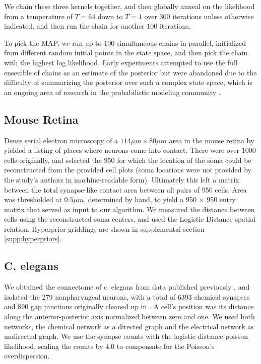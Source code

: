 \documentclass{article}
\begin{document}
We chain these three kernels together, and then globally
anneal on the likelihood from a temperature of $T=64$ down to 
$T=1$ over 300 iterations unless otherwise indicated, and
then run the chain for another $100$ iterations. 

To pick the MAP, we run up to $100$ simultaneous chains in parallel,
initialized from different random initial points in the state space,
and then pick the chain with the highest log likelihood. Early
experiments attempted to use the full ensemble of chains as an
estimate of the posterior but were abandoned due to the difficulty of
summarizing the posterior over such a complex state space, which is an
ongoing area of research in the probabilistic modeling community
.




\subsection {Mouse Retina}
\label{supp:mouseretina}
Dense serial electron microscopy of a $114\mu m \times 80 \mu m $ area
in the mouse retina by \autocite{Helmstaedter2013} yielded a listing
of places where neurons come into contact. There were over 1000 cells
originally, and selected the $950$ for which the location of the soma
could be reconstructed from the provided cell plots (soma locations
were not provided by the study's authors in machine-readable
form). Ultimately this left a matrix between the total synapse-like
contact area between all pairs of 950 cells. Area was thresholded at
$0.5\mu m$, determined by hand, to yield a 950 $\times$ 950 entry
matrix that served as input to our algorithm. We measured the distance
between cells using the reconstructed soma centers, and used the
Logistic-Distance spatial relation. Hyperprior griddings are shown in
supplemental section \ref{supp:hyperpriors}.

\subsection{C. elegans}

We obtained the connectome of c. elegans from data published
previously \autocite{Varshney2011}, and isolated the 279 nonpharyngeal
neurons, with a total of 6393 chemical synapses and 890 gap junctions
originally cleaned up in \autocite{Chen2006}. A cell's position was
its distance along the anterior-posterior axis normalized between zero
and one. We used both networks, the chemical network as a directed
graph and the electrical network as undirected graph. We use the
synapse counts with the logistic-distance poisson likelihood, scaling
the counts by 4.0 to compensate for the Poisson's overdispersion.
\end{document}
